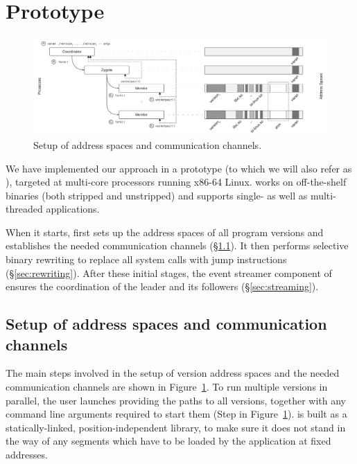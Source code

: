 \section{Prototype}
\label{sec:prototype}


\begin{figure}[t]
  \begin{center}
    \includegraphics[width=\textwidth]{efficient-execution/figures/address-space}
    \caption{Setup of address spaces and communication channels.}
    \label{fig:setup}
  \end{center}
\end{figure}


We have implemented our approach in a prototype (to which we will also
refer as \varan), targeted at multi-core processors running x86-64 Linux.
\varan works on off-the-shelf binaries (both stripped and unstripped)
and supports single- as well as multi-threaded applications.

When it starts, \varan first sets up the address spaces of all program
versions and establishes the needed communication channels
(\S\ref{sec:setup}).  It then performs selective binary rewriting to
replace all system calls with  jump instructions
(\S\ref{sec:rewriting}).  After these initial stages, the event
streamer component of \varan ensures the coordination of the leader and
its followers (\S\ref{sec:streaming}).


\subsection{Setup of address spaces and communication channels}
\label{sec:setup}

The main steps involved in the setup of version address spaces and the
needed communication channels are shown in Figure~\ref{fig:setup}.  To
run multiple versions in parallel, the user launches \varan providing the
paths to all versions, together with any command line arguments required
to start them (Step  in Figure~\ref{fig:setup}). \varan is built
as a statically-linked, position-independent library, to make sure it
does not stand in the way of any segments which have to be loaded by the
application at fixed addresses.


